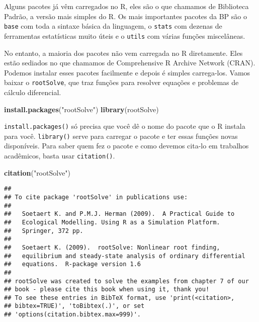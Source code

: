 \documentclass[]{article}
\newenvironment{Shaded}{\begin{snugshade}}{\end{snugshade}}
\newcommand{\KeywordTok}[1]{\textcolor[rgb]{0.13,0.29,0.53}{\textbf{#1}}}
\newcommand{\NormalTok}[1]{#1}
\newcommand{\StringTok}[1]{\textcolor[rgb]{0.31,0.60,0.02}{#1}}
\begin{document}
Alguns pacotes já vêm carregados no R, eles são o que chamamos de
Biblioteca Padrão, a versão mais simples do R. Os mais importantes
pacotes da BP são o \texttt{base} com toda a sintaxe básica da
linguagem, o \texttt{stats} com dezenas de ferramentas estatísticas
muito úteis e o \texttt{utils} com várias funções miscelâneas.

No entanto, a maioria dos pacotes não vem carregada no R diretamente.
Eles estão sediados no que chamamos de Comprehensive R Archive Network
(CRAN). Podemos instalar esses pacotes facilmente e depois é simples
carrega-los. Vamos baixar o \texttt{rootSolve}, que traz funções para
resolver equações e problemas de cálculo diferencial.

\begin{Shaded}
\begin{Highlighting}[]
\KeywordTok{install.packages}\NormalTok{(}\StringTok{"rootSolve"}\NormalTok{)}
\KeywordTok{library}\NormalTok{(rootSolve)}
\end{Highlighting}
\end{Shaded}

\texttt{install.packages()} só precisa que você dê o nome do pacote que
o R instala para você. \texttt{library()} serve para carregar o pacote e
ter essas funções novas disponíveis. Para saber quem fez o pacote e como
devemos cita-lo em trabalhos acadêmicos, basta usar \texttt{citation()}.

\begin{Shaded}
\begin{Highlighting}[]
\KeywordTok{citation}\NormalTok{(}\StringTok{"rootSolve"}\NormalTok{)}
\end{Highlighting}
\end{Shaded}

\begin{verbatim}
## 
## To cite package 'rootSolve' in publications use:
## 
##   Soetaert K. and P.M.J. Herman (2009).  A Practical Guide to
##   Ecological Modelling. Using R as a Simulation Platform.
##   Springer, 372 pp.
## 
##   Soetaert K. (2009).  rootSolve: Nonlinear root finding,
##   equilibrium and steady-state analysis of ordinary differential
##   equations.  R-package version 1.6
## 
## rootSolve was created to solve the examples from chapter 7 of our
## book - please cite this book when using it, thank you!
## To see these entries in BibTeX format, use 'print(<citation>,
## bibtex=TRUE)', 'toBibtex(.)', or set
## 'options(citation.bibtex.max=999)'.
\end{verbatim}
\end{document}
